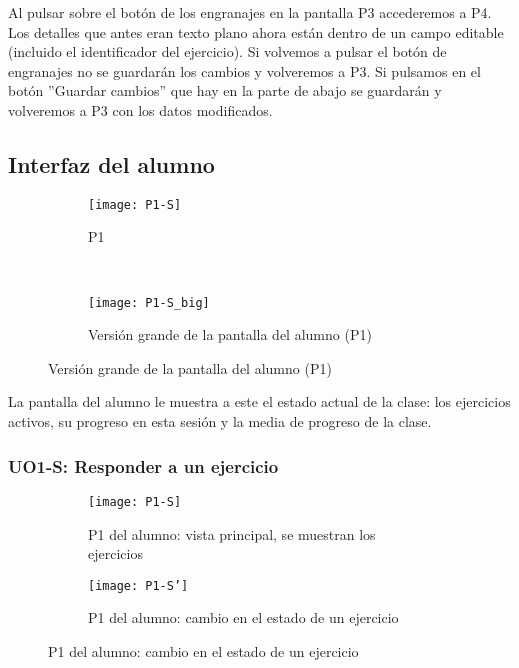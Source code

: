 Al pulsar sobre el botón de los engranajes en la pantalla P3 accederemos a P4. Los detalles que antes eran texto plano ahora están dentro de un campo editable (incluido el identificador del ejercicio). Si volvemos a pulsar el botón de engranajes no se guardarán los cambios y volveremos a P3. Si pulsamos en el botón ''Guardar cambios'' que hay en la parte de abajo se guardarán y volveremos a P3 con los datos modificados.\\

\subsection{Interfaz del alumno}
\label{diseno-e-implementacion:interfaces:alumno}

\begin{figure}[H]
\begin{subfigure}[b]{\textwidth}
	\centering
	\texttt{[image: P1-S]}
	\caption{P1}
	\label{fig:diseno-e-implementacion:interfaces:alumno:p1}
\end{subfigure}
\\
\begin{subfigure}[b]{\textwidth}
	\centering
	\texttt{[image: P1-S\_big]}
	\caption{Versión grande de la pantalla del alumno (P1)}
	\label{fig:diseno-e-implementacion:interfaces:alumno:p1_big}
\end{subfigure}

\label{diseno-e-implementacion:interfaces:alumno}
\end{figure}

La pantalla del alumno le muestra a este el estado actual de la clase: los ejercicios activos, su progreso en esta sesión y la media de progreso de la clase.

\subsubsection{UO1-S: Responder a un ejercicio}
\label{diseno-e-implementacion:interfaces:alumno:uo1-s}

\begin{figure}[H]
\begin{subfigure}[b]{0.5\textwidth}
	\centering
	\texttt{[image: P1-S]}
	\caption{P1 del alumno: vista principal, se muestran los ejercicios}
	\label{fig:diseno-e-implementacion:interfaces:alumno:p1}
\end{subfigure}
%
\begin{subfigure}[b]{0.5\textwidth}
	\centering
	\texttt{[image: P1-S']}
	\caption{P1 del alumno: cambio en el estado de un ejercicio}
	\label{fig:diseno-e-implementacion:interfaces:alumno:p1'}
\end{subfigure}

\label{fig:p1-student}
\end{figure}

